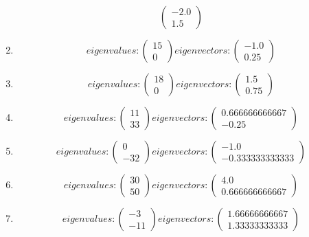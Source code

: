 \documentclass{article}%
\begin{document}
\begin{enumerate}[label=\arabic*)]
\[\begin{pmatrix}
-2.0\\%
1.5%
\end{pmatrix}%
\]%
\item%
\[%
eigenvalues: \begin{pmatrix}%
15\\%
0%
\end{pmatrix} eigenvectors: \begin{pmatrix}%
-1.0\\%
0.25%
\end{pmatrix}%
\]%
\item%
\[%
eigenvalues: \begin{pmatrix}%
18\\%
0%
\end{pmatrix} eigenvectors: \begin{pmatrix}%
1.5\\%
0.75%
\end{pmatrix}%
\]%
\item%
\[%
eigenvalues: \begin{pmatrix}%
11\\%
33%
\end{pmatrix} eigenvectors: \begin{pmatrix}%
0.666666666667\\%
-0.25%
\end{pmatrix}%
\]%
\item%
\[%
eigenvalues: \begin{pmatrix}%
0\\%
-32%
\end{pmatrix} eigenvectors: \begin{pmatrix}%
-1.0\\%
-0.333333333333%
\end{pmatrix}%
\]%
\item%
\[%
eigenvalues: \begin{pmatrix}%
30\\%
50%
\end{pmatrix} eigenvectors: \begin{pmatrix}%
4.0\\%
0.666666666667%
\end{pmatrix}%
\]%
\item%
\[%
eigenvalues: \begin{pmatrix}%
-3\\%
-11%
\end{pmatrix} eigenvectors: \begin{pmatrix}%
1.66666666667\\%
1.33333333333%
\end{pmatrix}%
\]
\end{enumerate}
\end{document}
